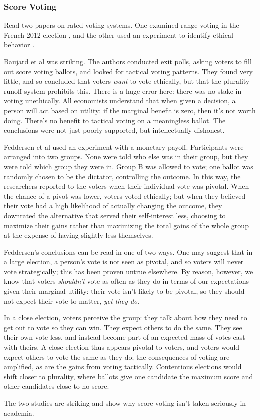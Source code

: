 \subsubsection{Score Voting}

Read two papers on rated voting systems.  One examined range voting in the French 2012 election \autocite{Baujard2014}, and the other used an experiment to identify ethical behavior \autocite{Feddersen2009}.

Baujard et al was striking.  The authors conducted exit polls, asking voters to fill out score voting ballots, and looked for tactical voting patterns.  They found very little, and so concluded that voters \textit{want} to vote ethically, but that the plurality runoff system prohibits this.  There is a huge error here:  there was no stake in voting unethically.  All economists understand that when given a decision, a person will act based on utility:  if the marginal benefit is zero, then it's not worth doing.  There's no benefit to tactical voting on a meaningless ballot.  The conclusions were not just poorly supported, but intellectually dishonest.

Feddersen et al used an experiment with a monetary payoff.  Participants were arranged into two groups.  None were told who else was in their group, but they were told which group they were in.  Group B was allowed to vote; one ballot was randomly chosen to be the dictator, controlling the outcome.  In this way, the researchers reported to the voters when their individual vote was pivotal.  When the chance of a pivot was lower, voters voted ethically; but when they believed their vote had a high likelihood of actually changing the outcome, they downrated the alternative that served their self-interest less, choosing to maximize their gains rather than maximizing the total gains of the whole group at the expense of having slightly less themselves.

Feddersen's conclusions can be read in one of two ways.  One may suggest that in a large election, a person's vote is not seen as pivotal, and so voters will never vote strategically; this has been proven untrue elsewhere.  By reason, however, we know that voters \textit{shouldn't} vote as often as they do in terms of our expectations given their marginal utility:  their vote isn't likely to be pivotal, so they should not expect their vote to matter, \textit{yet they do}.

In a close election, voters perceive the group:  they talk about how they need to get out to vote so they can win.  They expect others to do the same.  They see their own vote less, and instead become part of an expected mass of votes cast with theirs.  A close election thus appears pivotal to voters, and voters would expect others to vote the same as they do; the consequences of voting are amplified, as are the gains from voting tactically.  Contentious elections would shift closer to plurality, where ballots give one candidate the maximum score and other candidates close to no score.

The two studies are striking and show why score voting isn't taken seriously in academia.
